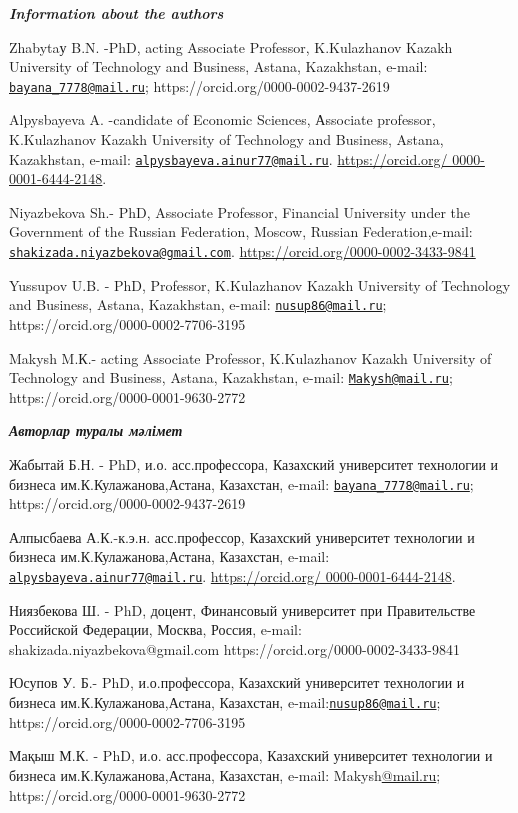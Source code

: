 \begin{authorinfo}
\emph{{\bfseries Information about the authors}}

Zhabytaу B.N. -PhD, acting Associate Professor, K.Kulazhanov Kazakh
University of Technology and Business, Astana, Kazakhstan, e-mail:
\href{mailto:bayana_7778@mail.ru}{\nolinkurl{bayana\_7778@mail.ru}};
https://orcid.org/0000-0002-9437-2619

Alpysbayeva A. -candidate of Economic Sciences, Аssociate professor,
K.Kulazhanov Kazakh University of Technology and Business, Astana,
Kazakhstan, e-mail:
\href{mailto:alpysbayeva.ainur77@mail.ru}{\nolinkurl{alpysbayeva.ainur77@mail.ru}}.
\href{https://orcid.org/\%200000-0001-6444-2148}{https://orcid.org/
0000-0001-6444-2148}.

Niyazbekova Sh.- PhD, Associate Professor, Financial University under
the Government of the Russian Federation, Moscow, Russian
Federation,e-mail:
\href{mailto:shakizada.niyazbekova@gmail.com}{\nolinkurl{shakizada.niyazbekova@gmail.com}}.
\url{https://orcid.org/0000-0002-3433-9841}

Yussupov U.B. - PhD, Professor, K.Kulazhanov Kazakh University of
Technology and Business, Astana, Kazakhstan, e-mail:
\href{mailto:nusup86@mail.ru}{\nolinkurl{nusup86@mail.ru}};
https://orcid.org/0000-0002-7706-3195

Makysh M.К.- acting Associate Professor, K.Kulazhanov Kazakh University
of Technology and Business, Astana, Kazakhstan, e-mail:
\href{mailto:Makysh@mail.ru}{\nolinkurl{Makysh@mail.ru}};
https://orcid.org/0000-0001-9630-2772

\emph{{\bfseries Авторлар туралы мәлімет}}

Жабытай Б.Н. - PhD, и.о. асс.профессора, Казахский университет
технологии и бизнеса им.К.Кулажанова,Астана, Казахстан, e-mail:
\href{mailto:bayana_7778@mail.ru}{\nolinkurl{bayana\_7778@mail.ru}};
https://orcid.org/0000-0002-9437-2619

Алпысбаева А.К.-к.э.н. асс.профессор, Казахский университет технологии и
бизнеса им.К.Кулажанова,Астана, Казахстан, e-mail:
\href{mailto:alpysbayeva.ainur77@mail.ru}{\nolinkurl{alpysbayeva.ainur77@mail.ru}}.
\href{https://orcid.org/\%200000-0001-6444-2148}{https://orcid.org/
0000-0001-6444-2148}.

Ниязбекова Ш. - PhD, доцент, Финансовый университет при Правительстве
Российской Федерации, Москва, Россия, e-mail:
shakizada.niyazbekova@gmail.com https://orcid.org/0000-0002-3433-9841

Юсупов У. Б.- PhD, и.о.профессора, Казахский университет технологии и
бизнеса им.К.Кулажанова,Астана, Казахстан,
e-mail:\href{mailto:nusup86@mail.ru}{\nolinkurl{nusup86@mail.ru}};
https://orcid.org/0000-0002-7706-3195

Мақыш М.К. - PhD, и.о. асс.профессора, Казахский университет технологии
и бизнеса им.К.Кулажанова,Астана, Казахстан, e-mail:
Makysh\href{mailto:bayana_7778@mail.ru}{@mail.ru};
https://orcid.org/0000-0001-9630-2772
\end{authorinfo}
